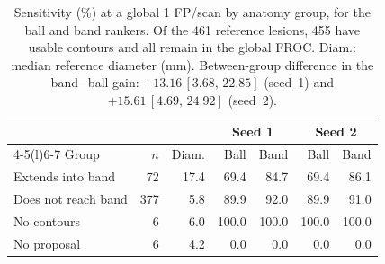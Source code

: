 \begin{table}[t]
\centering
\small
\setlength{\tabcolsep}{3.5pt}
\caption{Sensitivity (\%) at a global 1 FP/scan by anatomy group, for the ball and band rankers. Of the 461 reference lesions, 455 have usable contours and all remain in the global FROC. Diam.: median reference diameter (mm). Between-group difference in the band$-$ball gain: $+13.16\,[3.68,\,22.85]$ (seed~1) and $+15.61\,[4.69,\,24.92]$ (seed~2).}
\label{tab:anatomy}
\begin{tabular}{@{}lrrrrrr@{}}
\toprule
 & & & \multicolumn{2}{c}{Seed 1} & \multicolumn{2}{c}{Seed 2} \\
\cmidrule(lr){4-5}\cmidrule(l){6-7}
Group & $n$ & Diam. & Ball & Band & Ball & Band \\
\midrule
Extends into band & 72 & 17.4 & 69.4 & 84.7 & 69.4 & 86.1 \\
Does not reach band & 377 & 5.8 & 89.9 & 92.0 & 89.9 & 91.0 \\
No contours & 6 & 6.0 & 100.0 & 100.0 & 100.0 & 100.0 \\
No proposal & 6 & 4.2 & 0.0 & 0.0 & 0.0 & 0.0 \\
\bottomrule
\end{tabular}
\end{table}
